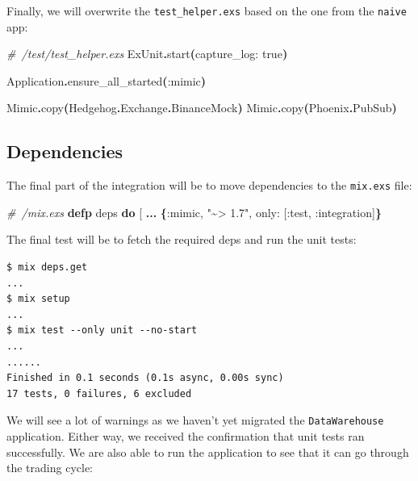 \documentclass[
  oneside]{book}
\newenvironment{Shaded}{\begin{snugshade}}{\end{snugshade}}
\newcommand{\CommentTok}[1]{\textcolor[rgb]{0.56,0.35,0.01}{\textit{#1}}}
\newcommand{\ConstantTok}[1]{\textcolor[rgb]{0.56,0.35,0.01}{#1}}
\newcommand{\FunctionTok}[1]{\textcolor[rgb]{0.13,0.29,0.53}{\textbf{#1}}}
\newcommand{\KeywordTok}[1]{\textcolor[rgb]{0.13,0.29,0.53}{\textbf{#1}}}
\newcommand{\NormalTok}[1]{#1}
\newcommand{\OperatorTok}[1]{\textcolor[rgb]{0.81,0.36,0.00}{\textbf{#1}}}
\newcommand{\OtherTok}[1]{\textcolor[rgb]{0.56,0.35,0.01}{#1}}
\newcommand{\StringTok}[1]{\textcolor[rgb]{0.31,0.60,0.02}{#1}}
\newcommand{\VariableTok}[1]{\textcolor[rgb]{0.00,0.00,0.00}{#1}}
\begin{document}
Finally, we will overwrite the \texttt{test\_helper.exs} based on the one from the \texttt{naive} app:

\begin{Shaded}
\begin{Highlighting}[]
\CommentTok{\# /test/test\_helper.exs}
\ConstantTok{ExUnit}\OperatorTok{.}\NormalTok{start}\FunctionTok{(}\VariableTok{capture\_log:} \ConstantTok{true}\FunctionTok{)}

\ConstantTok{Application}\OperatorTok{.}\NormalTok{ensure\_all\_started}\FunctionTok{(}\VariableTok{:mimic}\FunctionTok{)}

\ConstantTok{Mimic}\OperatorTok{.}\NormalTok{copy}\FunctionTok{(}\ConstantTok{Hedgehog}\OperatorTok{.}\ConstantTok{Exchange}\OperatorTok{.}\ConstantTok{BinanceMock}\FunctionTok{)}
\ConstantTok{Mimic}\OperatorTok{.}\NormalTok{copy}\FunctionTok{(}\ConstantTok{Phoenix}\OperatorTok{.}\ConstantTok{PubSub}\FunctionTok{)}
\end{Highlighting}
\end{Shaded}

\subsection{Dependencies}\label{dependencies}

The final part of the integration will be to move dependencies to the \texttt{mix.exs} file:

\begin{Shaded}
\begin{Highlighting}[]
\CommentTok{\# /mix.exs}
  \KeywordTok{defp}\NormalTok{ deps }\KeywordTok{do}
    \OtherTok{[}
       \OperatorTok{...}
       \FunctionTok{\{}\VariableTok{:mimic}\NormalTok{, }\StringTok{"\textasciitilde{}\textgreater{} 1.7"}\NormalTok{, }\VariableTok{only:} \OtherTok{[}\VariableTok{:test}\NormalTok{, }\VariableTok{:integration}\OtherTok{]}\FunctionTok{\}}
\end{Highlighting}
\end{Shaded}

The final test will be to fetch the required deps and run the unit tests:

\begin{verbatim}
$ mix deps.get
...
$ mix setup
...
$ mix test --only unit --no-start
...
......
Finished in 0.1 seconds (0.1s async, 0.00s sync)
17 tests, 0 failures, 6 excluded
\end{verbatim}

We will see a lot of warnings as we haven't yet migrated the \texttt{DataWarehouse} application. Either way, we received the confirmation that unit tests ran successfully. We are also able to run the application to see that it can go through the trading cycle:
\end{document}
